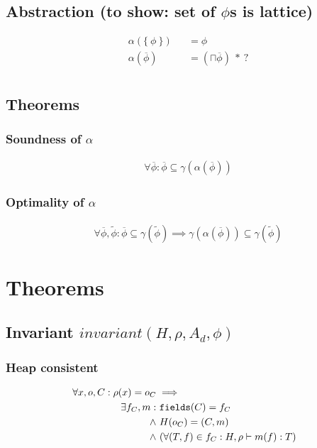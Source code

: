 \documentclass[11pt,a4paper]{article}
\begin{document}
\subsection{Abstraction (to show: set of $\phi$s is lattice)}
\begin{align*}
&\alpha(\{~ \phi ~\}) &&= \phi \\
&\alpha(\overline{\phi}) &&= (\sqcap \overline{\phi})\:*\:? \\
\end{align*}

\subsection{Theorems}
\subsubsection{Soundness of $\alpha$}
\begin{align*}
&\forall \overline{\phi} : \overline{\phi} \subseteq \gamma(\alpha(\overline{\phi}))
\end{align*}
\subsubsection{Optimality of $\alpha$}
\begin{align*}
&\forall \overline{\phi}, \widetilde{\phi} : \overline{\phi} \subseteq \gamma(\widetilde{\phi}) \implies  \gamma(\alpha(\overline{\phi}))\subseteq
\gamma(\widetilde{\phi}) 
\end{align*}

\section{Theorems}
\subsection{Invariant $invariant(H, \rho, A_d, \phi)$}
\subsubsection{Heap consistent}
\begin{align*}
\forall x, o, C : 
	\rho(x) = o_C &\implies\\
      \exists f_C, m :&~ 
        \texttt{fields}(C) = f_C \\
      \wedge&~ H(o_C) = (C, m) \\
      \wedge&~(\forall (T, f) \in f_C : H, \rho \vdash m(f) : T)
\end{align*}
\end{document}
